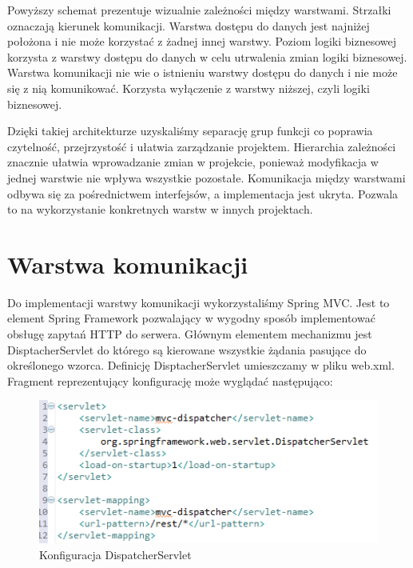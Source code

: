Powyższy schemat prezentuje wizualnie zależności między warstwami. Strzałki oznaczają kierunek komunikacji. Warstwa dostępu do danych jest najniżej położona i nie może korzystać z żadnej innej warstwy. Poziom logiki biznesowej korzysta z warstwy dostępu do danych w celu utrwalenia zmian logiki biznesowej. Warstwa komunikacji nie wie o istnieniu warstwy dostępu do danych i nie może się z nią komunikować. Korzysta wyłączenie z warstwy niższej, czyli logiki biznesowej.

Dzięki takiej architekturze uzyskaliśmy separację grup funkcji co poprawia czytelność, przejrzystość i ułatwia zarządzanie projektem. Hierarchia zależności znacznie ułatwia wprowadzanie zmian w projekcie, ponieważ modyfikacja w jednej warstwie nie wpływa wszystkie pozostałe. Komunikacja między warstwami odbywa się za pośrednictwem interfejsów, a implementacja jest ukryta. Pozwala to na wykorzystanie konkretnych warstw w innych projektach.


\section{Warstwa komunikacji}

Do implementacji warstwy komunikacji wykorzystaliśmy Spring MVC. Jest to element Spring Framework pozwalający w wygodny sposób implementować obsługę zapytań HTTP do serwera. Głównym elementem mechanizmu jest DisptacherServlet do którego są kierowane wszystkie żądania pasujące do określonego wzorca. Definicję DisptacherServlet umieszczamy w pliku web.xml. Fragment reprezentujący konfigurację może wyglądać następująco:

\begin{figure}[H]
	\centering
	\includegraphics[width=\textwidth]{images/dispatcher.png}
	\caption{Konfiguracja DispatcherServlet}
\end{figure}

